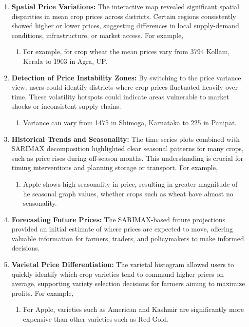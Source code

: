 \documentclass[a4paper, 12pt]{article}
\begin{document}
\begin{enumerate}
    \item \textbf{Spatial Price Variations:} The interactive map revealed significant spatial disparities in mean crop prices across districts. Certain regions consistently showed higher or lower prices, suggesting differences in local supply-demand conditions, infrastructure, or market access.
    For example,
    \begin{enumerate}
        \item For example, for crop wheat the mean prices vary from 3794 Kollam, Kerala  to 1903 in Agra, UP.
        
    \end{enumerate}

    \item \textbf{Detection of Price Instability Zones:} By switching to the price variance view, users could identify districts where crop prices fluctuated heavily over time. These volatility hotspots could indicate areas vulnerable to market shocks or inconsistent supply chains.
    \begin{enumerate}
         \item Variance can vary from 1475 in Shimoga, Karnataka to  225 in Panipat.
    \end{enumerate}

    \item \textbf{Historical Trends and Seasonality:} The time series plots combined with SARIMAX decomposition highlighted clear seasonal patterns for many crops, such as price rises during off-season months. This understanding is crucial for timing interventions and planning storage or transport.
    For example,
    \begin{enumerate}
        \item Apple shows high seasonality in price, resulting in greater magnitude of he seasonal graph values, whether crops such as wheat have almost no seasonality.
    \end{enumerate}

    \item \textbf{Forecasting Future Prices:} The SARIMAX-based future projections provided an initial estimate of where prices are expected to move, offering valuable information for farmers, traders, and policymakers to make informed decisions.
    

    \item \textbf{Varietal Price Differentiation:} The varietal histogram allowed users to quickly identify which crop varieties tend to command higher prices on average, supporting variety selection decisions for farmers aiming to maximize profits.
    For example, 
    \begin{enumerate}
        \item For Apple, varieties such as American and Kashmir are significantly more expensive than other varieties such as Red Gold.
    \end{enumerate}


\end{enumerate}
\end{document}
